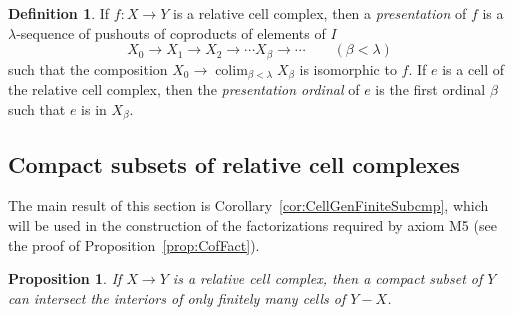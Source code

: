 \documentclass{amsart}
\numberwithin{equation}{section}
\theoremstyle{slplain}
\newtheorem{prop}[equation]{Proposition}
\theoremstyle{definition}
\newtheorem{defn}[equation]{Definition} %
\theoremstyle{remark}
\newcommand{\propref}{Proposition~\ref}
\DeclareMathOperator*{\colim}{colim}
\begin{document}
\begin{defn}
  \label{def:presentation}
  If $f\colon X \to Y$ is a relative cell complex, then a
  \emph{presentation} of $f$ is a $\lambda$-sequence of pushouts of
  coproducts of elements of $I$
  \begin{displaymath}
    X_{0} \to X_{1} \to X_{2} \to \cdots X_{\beta} \to \cdots
    \qquad (\beta < \lambda)
  \end{displaymath}
  such that the composition $X_{0} \to \colim_{\beta <
    \lambda}X_{\beta}$ is isomorphic to $f$.  If $e$ is a cell of the
  relative cell complex, then the \emph{presentation ordinal} of $e$
  is the first ordinal $\beta$ such that $e$ is in $X_{\beta}$.
\end{defn}




\subsection{Compact subsets of relative cell complexes}
\label{sec:CmpctSubset}

The main result of this section is
Corollary~\ref{cor:CellGenFiniteSubcmp}, which will be used in the
construction of the factorizations required by axiom M5 (see the proof
of \propref{prop:CofFact}).

\begin{prop}
  \label{prop:RelCellCompSubset}
  If $X \to Y$ is a relative cell complex, then a compact subset of
  $Y$ can intersect the interiors of only finitely many cells of
  $Y-X$.
\end{prop}
\end{document}

